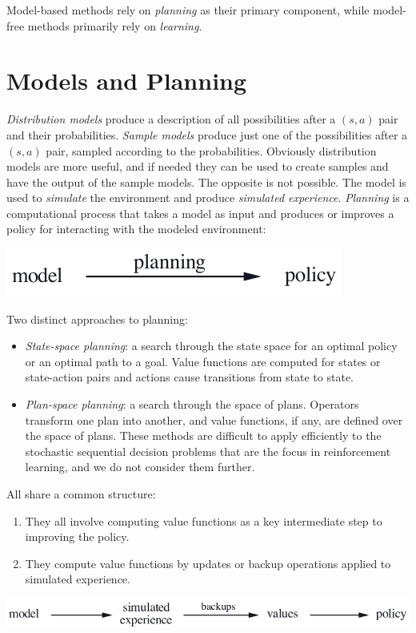 Model-based methods rely on \emph{planning} as their primary component, while model-free methods
primarily rely on \emph{learning}.


\section{Models and Planning}
\label{sec:models_and_planning}
\emph{Distribution models}\label{t:distribution_model} produce a description of all possibilities
after a $(s,a)$ pair and their probabilities.
\emph{Sample models}\label{t:sample_model} produce just one of the possibilities after a $(s,a)$
pair, sampled according to the probabilities.
Obviously distribution models are more useful, and if needed they can be used to create samples
and have the output of the sample models.
The opposite is not possible.
The model is used to \emph{simulate} the environment and produce \emph{simulated experience}.
\emph{Planning}\label{t:planning} is a computational process that takes a model as input and
produces or improves a policy for interacting with the modeled environment:
\begin{center}
    \includegraphics[scale=0.5]{img/model_planning_policy.png}
\end{center}
Two distinct approaches to planning:
\begin{itemize}
    \item \emph{State-space planning}\label{t:state_space_planning}:
        a search through the state space for an optimal policy or an optimal path to a goal.
        Value functions are computed for states or state-action pairs and actions cause
        transitions from state to state.
    \item \emph{Plan-space planning}\label{t:plan_space_planning}:
        a search through the space of plans.
        Operators transform one plan into another, and value functions, if any, are defined over
        the space of plans.
        These methods are difficult to apply efficiently to the stochastic sequential decision
        problems that are the focus in reinforcement learning, and we do not consider them further.
\end{itemize}
All  share a common structure:
\begin{enumerate}
    \item They all involve computing value functions as a key intermediate step to improving the
        policy.
    \item They compute value functions by updates or backup operations applied to simulated
        experience.
\end{enumerate}
\begin{center}
    \includegraphics[width=\textwidth]{img/structure_state_space_planning.png}
\end{center}

